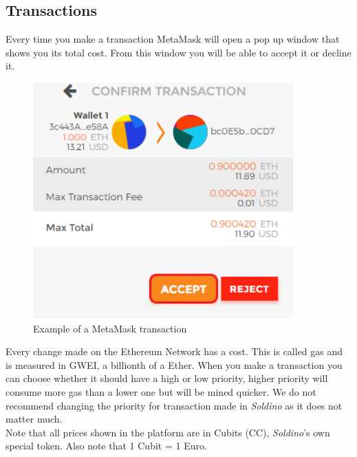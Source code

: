 	\subsection{Transactions}
	Every time you make a transaction MetaMask will open a pop up window that 
	shows you its total cost.
	From this window you will be able to accept it or decline it.\\
	\begin{figure}[H]
		\includegraphics[width=10cm]{res/images/metamask_transaction.png}
		\centering
		\caption{Example of a MetaMask transaction}
	\end{figure}
	\noindent 
	Every change made on the Ethereum Network has a cost. This is called gas 
	and is measured in GWEI, a billionth of a Ether. When you make a 
	transaction you can choose whether it should have a high or low priority, 
	higher priority will consume more gas than a lower one but will be mined 
	quicker. We do not recommend changing the priority for transaction made 
	in \textit{Soldino} as it does not matter much.\\
	Note that all prices shown in the platform are in Cubits (CC), 
	\textit{Soldino}'s own special token. Also note that 1 Cubit = 1 Euro.
